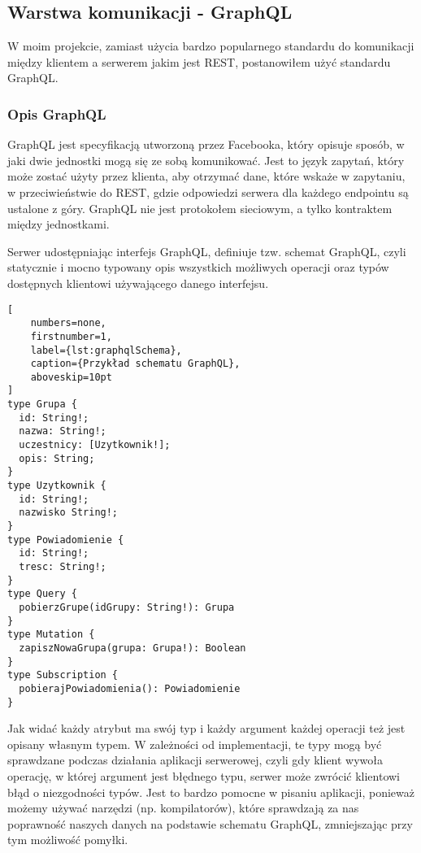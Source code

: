 \subsection{Warstwa komunikacji - GraphQL}
W moim projekcie, zamiast użycia bardzo popularnego standardu do komunikacji między klientem a serwerem jakim jest REST, postanowiłem użyć standardu GraphQL.

\subsubsection{Opis GraphQL}
GraphQL jest specyfikacją utworzoną przez Facebooka, który opisuje sposób, w jaki dwie jednostki mogą się ze sobą komunikować. Jest to język zapytań, który może zostać użyty przez klienta, aby otrzymać dane, które wskaże w zapytaniu, w przeciwieństwie do REST, gdzie odpowiedzi serwera dla każdego endpointu są ustalone z góry. GraphQL nie jest protokołem sieciowym, a tylko kontraktem między jednostkami.

Serwer udostępniając interfejs GraphQL, definiuje tzw. schemat GraphQL, czyli statycznie i mocno typowany opis wszystkich możliwych operacji oraz typów dostępnych klientowi używającego danego interfejsu. 

\begin{addmargin}[6mm]{0mm}
\begin{lstlisting}[
    numbers=none,
    firstnumber=1,
    label={lst:graphqlSchema},
    caption={Przykład schematu GraphQL},
    aboveskip=10pt
]
type Grupa {
  id: String!;
  nazwa: String!;
  uczestnicy: [Uzytkownik!];
  opis: String;
}
type Uzytkownik {
  id: String!;
  nazwisko String!;
}
type Powiadomienie {
  id: String!;
  tresc: String!;
}
type Query {
  pobierzGrupe(idGrupy: String!): Grupa
}
type Mutation {
  zapiszNowaGrupa(grupa: Grupa!): Boolean
}
type Subscription {
  pobierajPowiadomienia(): Powiadomienie
}
\end{lstlisting}
\end{addmargin}
Jak widać każdy atrybut ma swój typ i każdy argument każdej operacji też jest opisany własnym typem. W zależności od implementacji, te typy mogą być sprawdzane podczas działania aplikacji serwerowej, czyli gdy klient wywoła operację, w której argument jest błędnego typu, serwer może zwrócić klientowi błąd o niezgodności typów. Jest to bardzo pomocne w pisaniu aplikacji, ponieważ możemy używać narzędzi (np. kompilatorów), które sprawdzają za nas poprawność naszych danych na podstawie schematu GraphQL, zmniejszając przy tym możliwość pomyłki.

